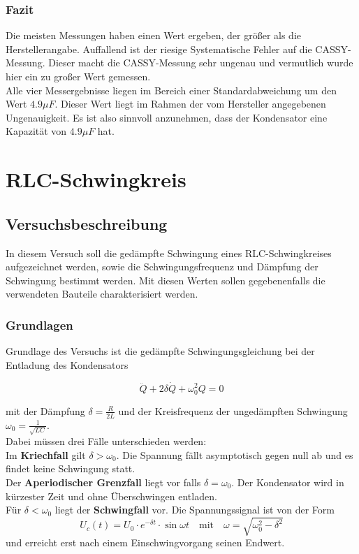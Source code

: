 \documentclass[12pt,a4paper]{article}
\begin{document}
\subsubsection{Fazit}
Die meisten Messungen haben einen Wert ergeben, der größer als die Herstellerangabe. Auffallend ist der riesige Systematische Fehler auf die CASSY-Messung. Dieser macht die CASSY-Messung sehr ungenau und vermutlich wurde hier ein zu großer Wert gemessen.\\
Alle vier Messergebnisse liegen im Bereich einer Standardabweichung um den Wert $4.9\mu F$. Dieser Wert liegt im Rahmen der vom Hersteller angegebenen Ungenauigkeit. Es ist also sinnvoll anzunehmen, dass der Kondensator eine Kapazität von $4.9\mu F$ hat.
\newpage

\section{RLC-Schwingkreis}
\subsection{Versuchsbeschreibung}

In diesem Versuch soll die gedämpfte Schwingung eines RLC-Schwingkreises aufgezeichnet werden, sowie die Schwingungsfrequenz und Dämpfung der Schwingung bestimmt werden.
Mit diesen Werten sollen gegebenenfalls die verwendeten Bauteile charakterisiert werden.

\subsubsection{Grundlagen}
Grundlage des Versuchs ist die gedämpfte Schwingungsgleichung bei der Entladung des Kondensators

\begin{equation}
\ddot{Q}+2\delta \dot{Q}+\omega_0^2 Q=0
\end{equation}

mit der Dämpfung $\delta=\frac{R}{2L}$ und der Kreisfrequenz der ungedämpften Schwingung $\omega_0=\frac{1}{\sqrt{LC}}$.\\
Dabei müssen drei Fälle unterschieden werden:\\
Im \textbf{Kriechfall} gilt $\delta > \omega_0$. Die Spannung fällt asymptotisch gegen null ab und es findet keine Schwingung statt.\\
Der \textbf{Aperiodischer Grenzfall} liegt vor falls $\delta=\omega_0$. Der Kondensator wird in kürzester Zeit und ohne Überschwingen entladen.\\
Für $\delta<\omega_0$ liegt der \textbf{Schwingfall} vor. Die Spannungssignal ist von der Form 
\begin{equation}
U_c(t)=U_0 \cdot e^{-\delta t} \cdot \sin{\omega t} \quad \text{mit} \quad \omega=\sqrt{\omega_0^2-\delta^2}
\end{equation}
und erreicht erst nach einem Einschwingvorgang seinen Endwert.\\
\end{document}
